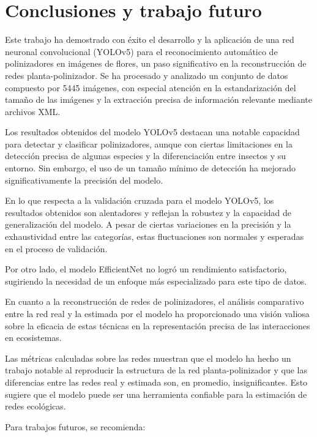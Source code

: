 \chapter{Conclusiones y trabajo futuro}
\label{chapter:conclusiones}

Este trabajo ha demostrado con éxito el desarrollo y la aplicación de una red neuronal convolucional (YOLOv5) para el reconocimiento automático de polinizadores en imágenes de flores, un paso significativo en la reconstrucción de redes planta-polinizador. Se ha procesado y analizado un conjunto de datos compuesto por 5445 imágenes, con especial atención en la estandarización del tamaño de las imágenes y la extracción precisa de información relevante mediante archivos XML.

Los resultados obtenidos del modelo YOLOv5 destacan una notable capacidad para detectar y clasificar polinizadores, aunque con ciertas limitaciones en la detección precisa de algunas especies y la diferenciación entre insectos y su entorno. Sin embargo, el uso de un tamaño mínimo de detección ha mejorado significativamente la precisión del modelo.

En lo que respecta a la validación cruzada para el modelo YOLOv5, los resultados obtenidos son alentadores y reflejan la robustez y la capacidad de generalización del modelo. A pesar de ciertas variaciones en la precisión y la exhaustividad entre las categorías, estas fluctuaciones son normales y esperadas en el proceso de validación.

Por otro lado, el modelo EfficientNet no logró un rendimiento satisfactorio, sugiriendo la necesidad de un enfoque más especializado para este tipo de datos.

En cuanto a la reconstrucción de redes de polinizadores, el análisis comparativo entre la red real y la estimada por el modelo ha proporcionado una visión valiosa sobre la eficacia de estas técnicas en la representación precisa de las interacciones en ecosistemas.

Las métricas calculadas sobre las redes muestran que el modelo ha hecho un trabajo notable al reproducir la estructura de la red planta-polinizador y que las diferencias entre las redes real y estimada son, en promedio, insignificantes. Esto sugiere que el modelo puede ser una herramienta confiable para la estimación de redes ecológicas.


Para trabajos futuros, se recomienda:

